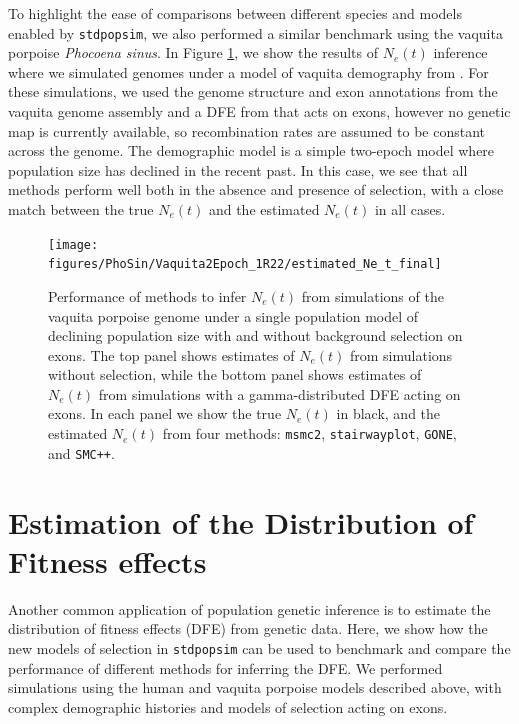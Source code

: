\documentclass[hidelinks]{article}
\newcommand{\stdpopsim}{\texttt{stdpopsim}\xspace}
\newcommand{\msmc}{\texttt{msmc2}\xspace}
\newcommand{\stairway}{\texttt{stairwayplot}\xspace}
\newcommand{\gone}{\texttt{GONE}\xspace}
\newcommand{\smcpp}{\texttt{SMC++}\xspace}
\begin{document}
    To highlight the ease of comparisons between different species and models enabled by \stdpopsim,
    we also performed a similar benchmark using the vaquita porpoise \textit{Phocoena sinus}.
    In Figure \ref{fig:1pop-vaquita-demography}, we show the results of $N_e(t)$ inference
    where we simulated genomes under a model of vaquita demography from \textcite{robinson2022critically}.
    For these simulations, we used the genome structure and exon annotations from the vaquita genome assembly
    and a DFE from \textcite{robinson2022critically} that acts on exons, however no genetic map 
    is currently available, so recombination rates are assumed to be constant across the genome.
    The demographic model is a simple two-epoch model where population size has declined in the recent past. 
    In this case, we see that all methods perform well both in the absence and presence of selection,
    with a close match between the true $N_e(t)$ and the estimated $N_e(t)$ in all cases.


\begin{figure}[t]
    \centering
    \texttt{[image: figures/PhoSin/Vaquita2Epoch\_1R22/estimated\_Ne\_t\_final]}
    \caption{
    \label{fig:1pop-vaquita-demography}
    Performance of methods to infer $N_e(t)$ from simulations of the vaquita porpoise genome under a single population
    model of declining population size \citep{robinson2022critically} with and without background selection on exons. 
    The top panel shows estimates of $N_e(t)$ from simulations
    without selection, while the bottom panel shows estimates of $N_e(t)$ from simulations with a gamma-distributed   
    DFE acting on exons. In each panel we show the true $N_e(t)$ in black, and the estimated $N_e(t)$ from four methods:    
    \msmc \citep{Schiffels2020}, \stairway \citep{liu2020stairway}, \gone \citep{santiago2020recent}, and \smcpp \citep{terhorst2017robust}.  
    }
\end{figure}

\section*{Estimation of the Distribution of Fitness effects}
    \label{dfe}
    Another common application of population genetic inference is to estimate the distribution of fitness effects (DFE)
    from genetic data. Here, we show how the new models of selection in \stdpopsim can be used to benchmark and compare
    the performance of different methods for inferring the DFE. We performed simulations using the 
    human and vaquita porpoise models described above, with complex demographic histories and models of selection acting on exons.
\end{document}
